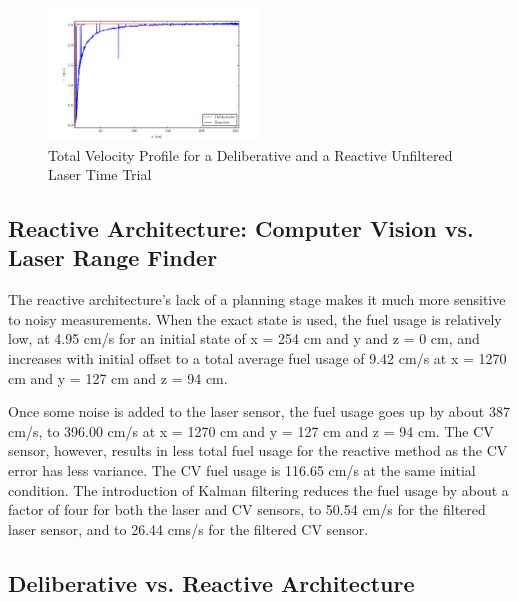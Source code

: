 \documentclass[journal, 10pt]{IEEEtran}
\begin{document}
\begin{figure}[tb]
\begin{center}
\includegraphics[width=0.5\textwidth]{figures/TotalVelocityNoisy.pdf}
\caption{Total Velocity Profile for a Deliberative and a Reactive Unfiltered Laser Time Trial }
\label{noisy_total}
\end{center}
\end{figure}

\subsection{Reactive Architecture: Computer Vision vs. Laser Range Finder}
The reactive architecture's lack of a planning stage makes it much more sensitive to noisy measurements. When the exact state is used, the fuel usage is relatively low, at 4.95 cm/s for an initial state of x = 254 cm and y and z = 0 cm, and increases with initial offset to a total average fuel usage of 9.42 cm/s at x = 1270 cm and y = 127 cm and z = 94 cm. 

Once some noise is added to the laser sensor, the fuel usage goes up by about 387 cm/s, to 396.00 cm/s at x = 1270 cm and y = 127 cm and z = 94 cm. The CV sensor, however, results in less total fuel usage for the reactive method as the CV error has less variance. The CV fuel usage is 116.65 cm/s at the same initial condition. The introduction of Kalman filtering reduces the fuel usage by about a factor of four for both the laser and CV sensors, to 50.54 cm/s for the filtered laser sensor, and to 26.44 cms/s for the filtered CV sensor.

\subsection{Deliberative vs. Reactive Architecture}
\end{document}
